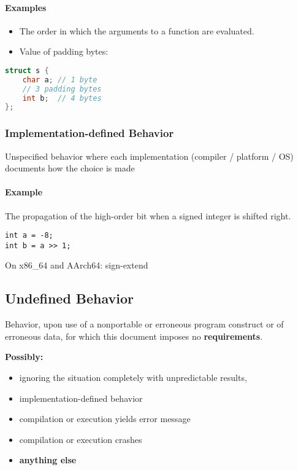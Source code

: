\documentclass[12pt]{article}
\begin{document}
\paragraph{Examples}

\begin{itemize}
  \item The order in which the arguments to a function are evaluated.
  \item Value of padding bytes:
\end{itemize}

\begin{lstlisting}[language=C]
struct s {
    char a; // 1 byte
    // 3 padding bytes
    int b;  // 4 bytes
};
\end{lstlisting}


\subsubsection{Implementation-defined Behavior}

Unspecified behavior where each implementation (compiler / platform / OS) documents how the choice is made

\paragraph{Example}

The propagation of the high-order bit when a signed integer is shifted right.

\begin{lstlisting}
int a = -8;
int b = a >> 1;
\end{lstlisting}


On x86\_64 and AArch64: sign-extend

\subsection{Undefined Behavior}

Behavior, upon use of a nonportable or erroneous program construct or of erroneous data,
for which this document imposes no \textbf{requirements}.

\textbf{Possibly:}
\begin{itemize}
    \item ignoring the situation completely with unpredictable results,
    \item implementation-defined behavior
    \item compilation or execution yields error message
    \item compilation or execution crashes
    \item \textbf{anything else}
\end{itemize}
\end{document}
